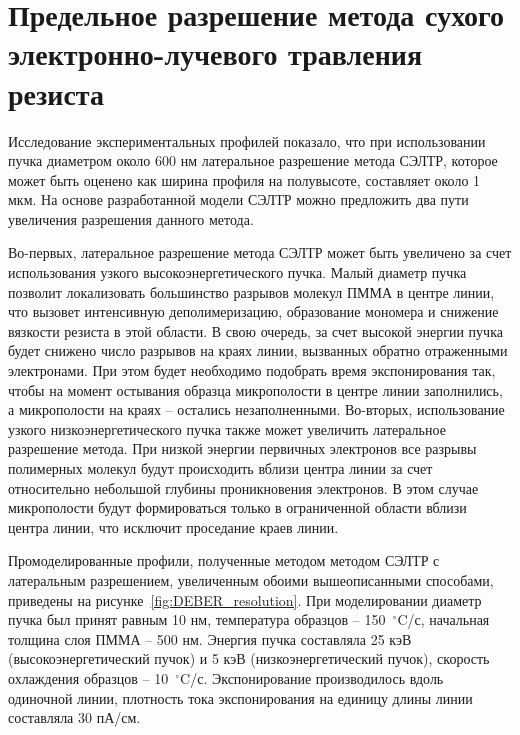 \section{Предельное разрешение метода сухого электронно-лучевого травления резиста}

Исследование экспериментальных профилей показало, что при использовании пучка диаметром около 600 нм латеральное разрешение метода СЭЛТР, которое может быть оценено как ширина профиля на полувысоте, составляет около 1 мкм.
На основе разработанной модели СЭЛТР можно предложить два пути увеличения разрешения данного метода.

Во-первых, латеральное разрешение метода СЭЛТР может быть увеличено за счет использования узкого высокоэнергетического пучка.
Малый диаметр пучка позволит локализовать большинство разрывов молекул ПММА в центре линии, что вызовет интенсивную деполимеризацию, образование мономера и снижение вязкости резиста в этой области.
В свою очередь, за счет высокой энергии пучка будет снижено число разрывов на краях линии, вызванных обратно отраженными электронами.
При этом будет необходимо подобрать время экспонирования так, чтобы на момент остывания образца микрополости в центре линии заполнились, а микрополости на краях -- остались незаполненными.
Во-вторых, использование узкого низкоэнергетического пучка также может увеличить латеральное разрешение метода. При низкой энергии первичных электронов все разрывы полимерных молекул будут происходить вблизи центра линии за счет относительно небольшой глубины проникновения электронов.
В этом случае микрополости будут формироваться только в ограниченной области вблизи центра линии, что исключит проседание краев линии.

Промоделированные профили, полученные методом методом СЭЛТР с латеральным разрешением, увеличенным обоими вышеописанными способами, приведены на рисунке~\ref{fig:DEBER_resolution}.
При моделировании диаметр пучка был принят равным 10 нм, температура образцов -- 150~$^\circ$C/с, начальная толщина слоя ПММА -- 500 нм.
Энергия пучка составляла 25 кэВ (высокоэнергетический пучок) и 5 кэВ (низкоэнергетический пучок), скорость охлаждения образцов -- 10~$^\circ$C/с.
Экспонирование производилось вдоль одиночной линии, плотность тока экспонирования на единицу длины линии составляла 30 пА/см.

